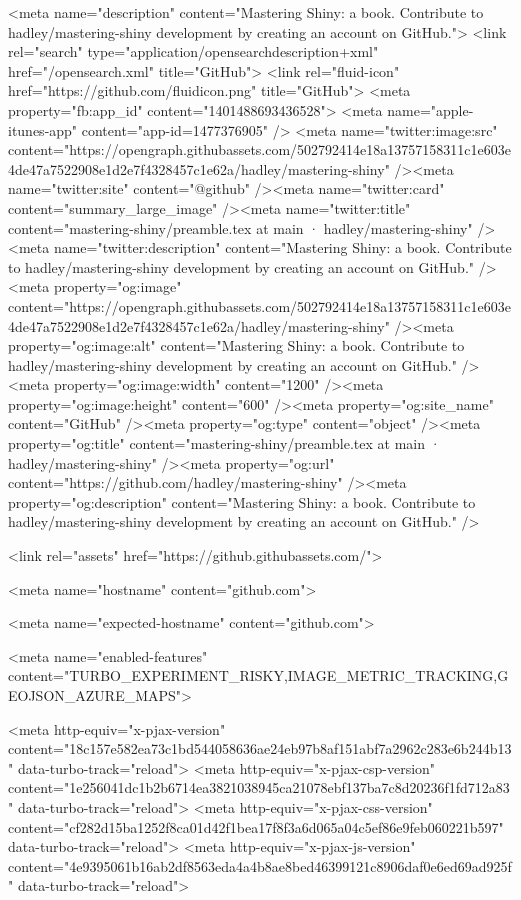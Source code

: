      <meta name="description" content="Mastering Shiny: a book. Contribute to hadley/mastering-shiny development by creating an account on GitHub.">
      <link rel="search" type="application/opensearchdescription+xml" href="/opensearch.xml" title="GitHub">
    <link rel="fluid-icon" href="https://github.com/fluidicon.png" title="GitHub">
    <meta property="fb:app_id" content="1401488693436528">
    <meta name="apple-itunes-app" content="app-id=1477376905" />
      <meta name="twitter:image:src" content="https://opengraph.githubassets.com/502792414e18a13757158311c1e603e4de47a7522908e1d2e7f4328457c1e62a/hadley/mastering-shiny" /><meta name="twitter:site" content="@github" /><meta name="twitter:card" content="summary_large_image" /><meta name="twitter:title" content="mastering-shiny/preamble.tex at main · hadley/mastering-shiny" /><meta name="twitter:description" content="Mastering Shiny: a book. Contribute to hadley/mastering-shiny development by creating an account on GitHub." />
      <meta property="og:image" content="https://opengraph.githubassets.com/502792414e18a13757158311c1e603e4de47a7522908e1d2e7f4328457c1e62a/hadley/mastering-shiny" /><meta property="og:image:alt" content="Mastering Shiny: a book. Contribute to hadley/mastering-shiny development by creating an account on GitHub." /><meta property="og:image:width" content="1200" /><meta property="og:image:height" content="600" /><meta property="og:site_name" content="GitHub" /><meta property="og:type" content="object" /><meta property="og:title" content="mastering-shiny/preamble.tex at main · hadley/mastering-shiny" /><meta property="og:url" content="https://github.com/hadley/mastering-shiny" /><meta property="og:description" content="Mastering Shiny: a book. Contribute to hadley/mastering-shiny development by creating an account on GitHub." />
      
    <link rel="assets" href="https://github.githubassets.com/">


        <meta name="hostname" content="github.com">



        <meta name="expected-hostname" content="github.com">

    <meta name="enabled-features" content="TURBO_EXPERIMENT_RISKY,IMAGE_METRIC_TRACKING,GEOJSON_AZURE_MAPS">


  <meta http-equiv="x-pjax-version" content="18c157e582ea73c1bd544058636ae24eb97b8af151abf7a2962c283e6b244b13" data-turbo-track="reload">
  <meta http-equiv="x-pjax-csp-version" content="1e256041dc1b2b6714ea3821038945ca21078ebf137ba7c8d20236f1fd712a83" data-turbo-track="reload">
  <meta http-equiv="x-pjax-css-version" content="cf282d15ba1252f8ca01d42f1bea17f8f3a6d065a04c5ef86e9feb060221b597" data-turbo-track="reload">
  <meta http-equiv="x-pjax-js-version" content="4e9395061b16ab2df8563eda4a4b8ae8bed46399121c8906daf0e6ed69ad925f" data-turbo-track="reload">

